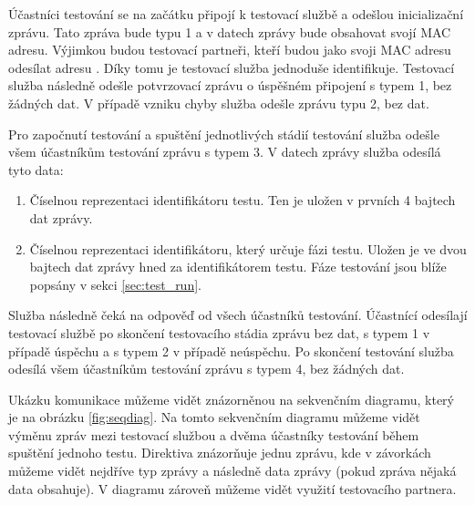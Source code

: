 Účastníci testování se na začátku připojí k testovací službě a odešlou inicializační zprávu. Tato zpráva bude typu 1 a v datech zprávy bude obsahovat svojí MAC adresu. Výjimkou budou testovací partneři, kteří budou jako svoji MAC adresu odesílat adresu . Díky tomu je testovací služba jednoduše identifikuje. Testovací služba následně odešle potvrzovací zprávu o úspěšném připojení s typem 1, bez žádných dat. V případě vzniku chyby služba odešle zprávu typu 2, bez dat. 

Pro započnutí testování a spuštění jednotlivých stádií testování služba odešle všem účastníkům testování zprávu s typem 3. V datech zprávy služba odesílá tyto data:

\begin{enumerate}
    \item Číselnou reprezentaci identifikátoru testu. Ten je uložen v prvních 4 bajtech dat zprávy.
    \item Číselnou reprezentaci identifikátoru, který určuje fázi testu. Uložen je ve dvou bajtech dat zprávy hned za identifikátorem testu. Fáze testování jsou blíže popsány v sekci \ref{sec:test_run}.
\end{enumerate}

Služba následně čeká na odpověď od všech účastníků testování. Účastnící odesílají testovací službě po skončení testovacího stádia zprávu bez dat, s typem 1 v případě úspěchu a s typem 2 v případě neúspěchu. Po skončení testování služba odesílá všem účastníkům testování zprávu s typem 4, bez žádných dat. 

Ukázku komunikace můžeme vidět znázorněnou na sekvenčním diagramu, který je na obrázku \ref{fig:seqdiag}. Na tomto sekvenčním diagramu můžeme vidět výměnu zpráv mezi testovací službou a dvěma účastníky testování během spuštění jednoho testu. Direktiva  znázorňuje jednu zprávu, kde v závorkách můžeme vidět nejdříve typ zprávy a následně data zprávy (pokud zpráva nějaká data obsahuje). V diagramu zároveň můžeme vidět využití testovacího partnera.

